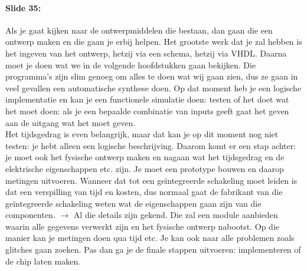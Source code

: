 \documentclass[10pt,a4paper]{book}
\begin{document}
\paragraph{Slide 35:} Als je gaat kijken naar de ontwerpmiddelen die bestaan, dan gaan die een ontwerp maken en die gaan je erbij helpen. Het grootste werk dat je zal hebben is het ingeven van het ontwerp, hetzij via een schema, hetzij via VHDL. Daarna moet je doen wat we in de volgende hoofdstukken gaan bekijken. Die programma's zijn slim genoeg om alles te doen wat wij gaan zien, dus ze gaan in veel gevallen een automatische synthese doen. Op dat moment heb je een logische implementatie en kan je een functionele simulatie doen: testen of het doet wat het moet doen: als je een bepaalde combinatie van inputs geeft gaat het geven aan de uitgang wat het moet geven.\\
Het tijdsgedrag is even belangrijk, maar dat kan je op dit moment nog niet testen: je hebt alleen een logische beschrijving. Daarom komt er een stap achter: je moet ook het fysische ontwerp maken en nagaan wat het tijdsgedrag en de elektrische eigenschappen etc. zijn. Je moet een prototype bouwen en daarop metingen uitvoeren. Wanneer dat tot een ge\"integreerde schakeling moet leiden is dat een verspilling van tijd en kosten, dus normaal gaat de fabrikant van die ge\"integreerde schakeling weten wat de eigenschappen gaan zijn van die componenten. $\rightarrow$ Al die details zijn gekend. Die zal een module aanbieden waarin alle gegevens verwerkt zijn en het fysische ontwerp nabootst. Op die manier kan je metingen doen qua tijd etc. Je kan ook naar alle problemen zoals glitches gaan zoeken. Pas dan ga je de finale stappen uitvoeren: implementeren of de chip laten maken. 
\end{document}
